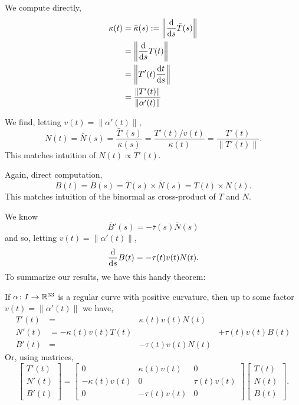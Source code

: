 We compute directly,
\begin{subequations}
  \begin{align}
    \kappa(t) &=\bar{\kappa}(s) :=\left\|\frac{\mathrm{d}}{\mathrm{d} s}\bar{T}(s)\right\|\\
    &=\left\|\frac{\mathrm{d}}{\mathrm{d} s}T(t)\right\|\\
    &=\left\|T'(t)\frac{\mathrm{d} t}{\mathrm{d} s}\right\|\\
    &=\frac{\|T'(t)\|}{\|\alpha'(t)\|}
  \end{align}
\end{subequations}

We find, letting $v(t)=\|\alpha'(t)\|$,
\begin{equation}
N(t) = \bar{N}(s) = \frac{\bar{T}'(s)}{\bar{\kappa}(s)} = \frac{T'(t)/v(t)}{\kappa(t)}
=\frac{T'(t)}{\|T'(t)\|}.
\end{equation}
This matches intuition of $N(t)\propto T'(t)$.

Again, direct computation,
\begin{equation}
B(t) = \bar{B}(s) = \bar{T}(s)\times\bar{N}(s) = T(t)\times N(t).
\end{equation}
This matches intuition of the binormal as cross-product of $T$ and $N$.

We know
\begin{equation}
\bar{B}'(s) = -\bar{\tau}(s)\bar{N}(s)
\end{equation}
and so, letting $v(t)=\|\alpha'(t)\|$,
\begin{equation}
\frac{\mathrm{d}}{\mathrm{d} s}B(t) = -\tau(t)v(t)N(t).
\end{equation}
To summarize our results, we have this handy theorem:

\begin{theorem}
If $\alpha\colon I\to\mathbb{R}^{33}$ is a regular curve with positive
curvature, then up to some factor $v(t)=\|\alpha'(t)\|$ we have,
\begin{subequations}
  \begin{alignat}{2}
T'(t) &=                    & \kappa(t)v(t)N(t) & \\
N'(t) &= -\kappa(t)v(t)T(t) &                   & + \tau(t)v(t)B(t)\\
B'(t) &=                    & -\tau(t)v(t)N(t)  &
  \end{alignat}
\end{subequations}
Or, using matrices,
\begin{equation}
\begin{bmatrix}T'(t)\\ N'(t)\\ B'(t)
\end{bmatrix}
=\begin{bmatrix}0 & \kappa(t)v(t) & 0\\
-\kappa(t)v(t) & 0 & \tau(t)v(t)\\
0 & -\tau(t)v(t) & 0
\end{bmatrix}
\begin{bmatrix}T(t)\\ N(t)\\ B(t)
\end{bmatrix}.
\end{equation}
\end{theorem}

